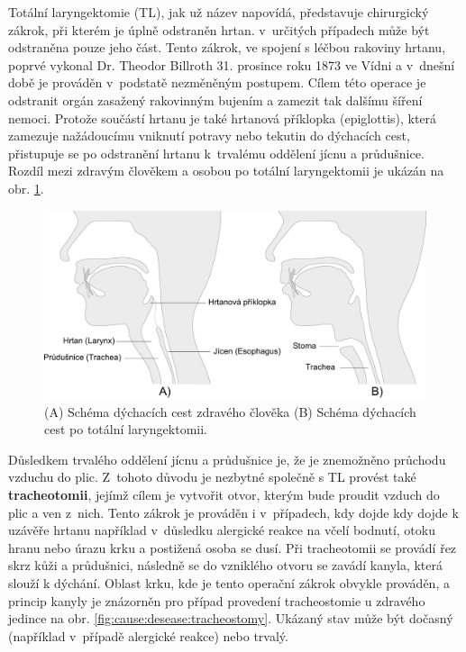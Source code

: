 Totální laryngektomie (TL), jak už název napovídá, představuje chirurgický
zákrok, při kterém je úplně odstraněn hrtan. v~určitých případech může být
odstraněna pouze jeho část. Tento zákrok, ve spojení s léčbou
rakoviny hrtanu, poprvé vykonal Dr. Theodor Billroth 31. prosince roku 1873 ve
Vídni \cite{Gussenbauer1874} a v~dnešní době je prováděn v~podstatě nezměněným postupem.
Cílem této operace je odstranit orgán zasažený rakovinným bujením a
zamezit tak dalšímu šíření nemoci. Protože součástí hrtanu je také hrtanová příklopka
(epiglottis), která zamezuje nažádoucímu vniknutí potravy nebo tekutin do
dýchacích cest, přistupuje se po odstranění hrtanu k~trvalému oddělení jícnu a průdušnice.
Rozdíl mezi zdravým člověkem a osobou po totální laryngektomii je ukázán na
obr. \ref{fig:cause:desease:laryngectomy}.

\begin{figure}[htb]
  \begin{center}
    \def\svgwidth{0.9\linewidth}
    \includegraphics[width=0.9\linewidth]{ch3-cause/figures/dychaci-cesty-tl}
    \caption[Schéma dýchacích cest zdravého člověka a pacienta po TL.]{(A) Schéma dýchacích cest zdravého člověka (B) Schéma dýchacích cest po totální laryngektomii.}
    \label{fig:cause:desease:laryngectomy}
  \end{center}
\end{figure}

Důsledkem trvalého oddělení jícnu a průdušnice je, že je znemožněno průchodu vzduchu do plic.
Z~tohoto důvodu je nezbytné společně s TL provést také \textbf{tracheotomii}, jejímž cílem je vytvořit otvor, kterým
bude proudit vzduch do plic a ven z~nich. Tento zákrok je prováděn i v~případech, kdy dojde kdy dojde k uzávěře hrtanu například v~důsledku alergické reakce na včelí bodnutí, otoku hranu nebo úrazu krku a postižená osoba se dusí. Při tracheotomii se provádí řez skrz kůži a průdušnici, následně se do vzniklého
otvoru se zavádí kanyla, která slouží k dýchání. Oblast krku, kde je tento operační zákrok obvykle prováděn, a
princip kanyly je znázorněn pro případ provedení tracheostomie u zdravého jedince na obr. \ref{fig:cause:desease:tracheostomy}. Ukázaný stav může být dočasný (například v~případě alergické
reakce) nebo trvalý.

